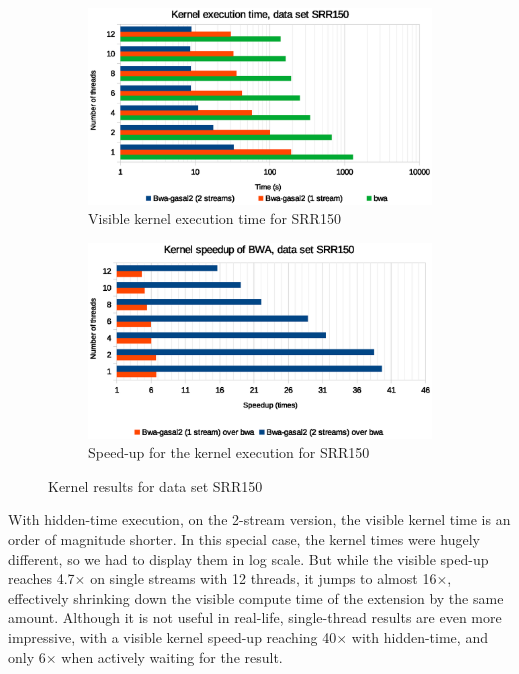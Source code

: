 \begin{figure}[p]
	\centering
	\begin{subfigure}[t]{1\textwidth}
		\centering
		\includegraphics[width=1\textwidth]{srr150/kernel-exec-time-srr150}
		\caption{Visible kernel execution time for SRR150}
		\label{fig:kernel-exec-time-srr150}
	\end{subfigure}%
	
	\begin{subfigure}[b]{1\textwidth}
		\centering
		\includegraphics[width=1\textwidth]{srr150/kernel-exec-speed-up-srr150}
		\caption{Speed-up for the kernel execution for SRR150}
		\label{fig:kernel-exec-speed-up-srr150}
	\end{subfigure}
	\caption{Kernel results for data set SRR150}
\end{figure}

With hidden-time execution, on the 2-stream version, the visible kernel time is an order of magnitude shorter. In this special case, the kernel times were hugely different, so we had to display them in log scale. But while the visible sped-up reaches 4.7$\times$ on single streams with 12 threads, it jumps to almost 16$\times$, effectively shrinking down the visible compute time of the extension by the same amount. Although it is not useful in real-life, single-thread results are even more impressive, with a visible kernel speed-up reaching 40$\times$ with hidden-time, and only 6$\times$ when actively waiting for the result.


